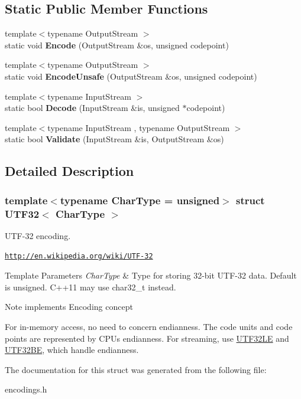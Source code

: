 \subsection*{Static Public Member Functions}
\begin{DoxyCompactItemize}
\item 
\mbox{\label{a02160_a511d1b09672ce535085895a28d8c2f13}} 
{\footnotesize template$<$typename Output\+Stream $>$ }\\static void {\bfseries Encode} (Output\+Stream \&os, unsigned codepoint)
\item 
\mbox{\label{a02160_ae50dd8dff92c36ee184c6d4eccb1961e}} 
{\footnotesize template$<$typename Output\+Stream $>$ }\\static void {\bfseries Encode\+Unsafe} (Output\+Stream \&os, unsigned codepoint)
\item 
\mbox{\label{a02160_a6e7258a5e982e101345dffdc355e9b53}} 
{\footnotesize template$<$typename Input\+Stream $>$ }\\static bool {\bfseries Decode} (Input\+Stream \&is, unsigned $\ast$codepoint)
\item 
\mbox{\label{a02160_a71336fb0546b3079e01bbd51d2fa2e45}} 
{\footnotesize template$<$typename Input\+Stream , typename Output\+Stream $>$ }\\static bool {\bfseries Validate} (Input\+Stream \&is, Output\+Stream \&os)
\end{DoxyCompactItemize}


\subsection{Detailed Description}
\subsubsection*{template$<$typename Char\+Type = unsigned$>$\newline
struct U\+T\+F32$<$ Char\+Type $>$}

U\+T\+F-\/32 encoding. 

\href{http://en.wikipedia.org/wiki/UTF-32}{\tt http\+://en.\+wikipedia.\+org/wiki/\+U\+T\+F-\/32} 
\begin{DoxyTemplParams}{Template Parameters}
{\em Char\+Type} & Type for storing 32-\/bit U\+T\+F-\/32 data. Default is unsigned. C++11 may use char32\+\_\+t instead. \\
\hline
\end{DoxyTemplParams}
\begin{DoxyNote}{Note}
implements Encoding concept

For in-\/memory access, no need to concern endianness. The code units and code points are represented by C\+PU\textquotesingle{}s endianness. For streaming, use \hyperlink{a02164}{U\+T\+F32\+LE} and \hyperlink{a02168}{U\+T\+F32\+BE}, which handle endianness. 
\end{DoxyNote}


The documentation for this struct was generated from the following file\+:\begin{DoxyCompactItemize}
\item 
encodings.\+h\end{DoxyCompactItemize}
